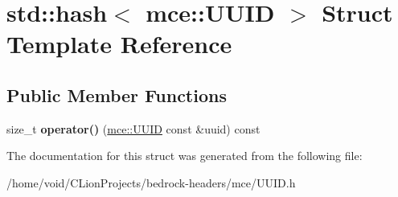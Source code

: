 \hypertarget{structstd_1_1hash_3_01mce_1_1_u_u_i_d_01_4}{}\section{std\+::hash$<$ mce\+::U\+U\+ID $>$ Struct Template Reference}
\label{structstd_1_1hash_3_01mce_1_1_u_u_i_d_01_4}
\subsection*{Public Member Functions}
\begin{DoxyCompactItemize}
\item 
\mbox{\label{structstd_1_1hash_3_01mce_1_1_u_u_i_d_01_4_a86ba854fa049c27e35e32fd09a208085}} 
size\+\_\+t {\bfseries operator()} (\mbox{\hyperlink{structmce_1_1_u_u_i_d}{mce\+::\+U\+U\+ID}} const \&uuid) const
\end{DoxyCompactItemize}


The documentation for this struct was generated from the following file\+:\begin{DoxyCompactItemize}
\item 
/home/void/\+C\+Lion\+Projects/bedrock-\/headers/mce/U\+U\+I\+D.\+h\end{DoxyCompactItemize}
